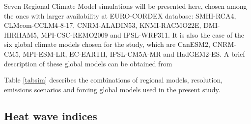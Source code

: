 Seven Regional Climate Model simulations will be presented here, chosen among the
ones with larger availability at EURO-CORDEX database: SMHI-RCA4, CLMcom-CCLM4-8-17, CNRM-ALADIN53, KNMI-RACMO22E, DMI-HIRHAM5, MPI-CSC-REMO2009 and IPSL-WRF311.
It is also the case of the six global climate models chosen for the study, which are CanESM2, CNRM-CM5, MPI-ESM-LR, EC-EARTH, IPSL-CM5A-MR and HadGEM2-ES. A brief description of these global models can be obtained from \cite{tay_al2012,jac_al2014}




Table \ref{tabsim} describes the combinations of regional models, resolution, emissions scenarios and
forcing global models used in the present study.


\subsection{Heat wave indices}

